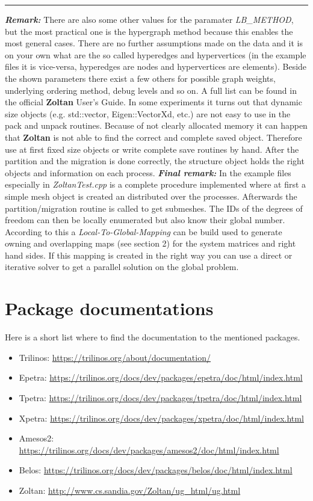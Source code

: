 \documentclass[10pt,a4paper,final,titlepage]{article}
\begin{document}
\noindent\rule{\textwidth}{0.5pt}
\newline \newline
\textbf{\textit{Remark:}} There are also some other values for the paramater \textit{LB\_METHOD}, but the most practical one is the hypergraph method because this enables the most general cases. There are no further assumptions made on the data and it is on your own what are the so called hyperedges and hypervertices (in the example files it is vice-versa, hyperedges are nodes and hypervertices are elements). Beside the shown parameters there exist a few others for possible graph weights, underlying ordering method, debug levels and so on. A full list can be found in the official \textbf{Zoltan} User's Guide. In some experiments it turns out that dynamic size objects (e.g. std::vector, Eigen::VectorXd, etc.) are not easy to use in the pack and unpack routines. Because of not clearly allocated memory it can happen that \textbf{Zoltan} is not able to find the correct and complete saved object. Therefore use at first fixed size objects or write complete save routines by hand. After the partition and the migration is done correctly, the structure object holds the right objects and information on each process.
\newline \newline
{\large\textbf{\textit{Final remark:}}} In the example files especially in \textit{ZoltanTest.cpp} is a complete procedure implemented where at first a simple mesh object is created an distributed over the processes. Afterwards the partition/migration routine is called to get submeshes. The IDs of the degrees of freedom can then be locally enumerated but also know their global number. According to this a \textit{Local-To-Global-Mapping} can be build used to generate owning and overlapping maps (see section 2) for the system matrices and right hand sides. If this mapping is created in the right way you can use a direct or iterative solver to get a parallel solution on the global problem.

\section{Package documentations}
Here is a short list where to find the documentation to the mentioned packages.
\begin{itemize}
\item Trilinos: \url{https://trilinos.org/about/documentation/}
\item Epetra: \url{https://trilinos.org/docs/dev/packages/epetra/doc/html/index.html}
\item Tpetra: \url{https://trilinos.org/docs/dev/packages/tpetra/doc/html/index.html}
\item Xpetra: \url{https://trilinos.org/docs/dev/packages/xpetra/doc/html/index.html}
\item Amesos2: \url{https://trilinos.org/docs/dev/packages/amesos2/doc/html/index.html}
\item Belos: \url{https://trilinos.org/docs/dev/packages/belos/doc/html/index.html}
\item Zoltan: \url{http://www.cs.sandia.gov/Zoltan/ug_html/ug.html}
\end{itemize}
\end{document}
